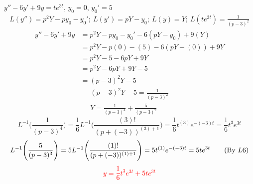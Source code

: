 \item [6.] $y''- 6y' + 9y= te^{3t}$, $y_0=0$, $y_0'=5$
\begin{gather*}
    L(y'')=p^2Y-py_0-y_0';\:
    L(y')=pY-y_0;\:
    L(y)=Y;\:
    L(te^{3t})=\frac{1}{(p-3)^2}
\end{gather*}
\begin{align*}
    y''- 6y' + 9y
    &=p^2Y-py_0-y_0'-6(pY-y_0)+9(Y)\\
    &=p^2Y-p(0)-(5)-6(pY-(0))+9Y\\
    &=p^2Y-5-6pY+9Y\\
    &=p^2Y-6pY+9Y-5\\
    &=(p-3)^2Y-5
\end{align*}
\begin{gather*}
    (p-3)^2Y-5=\frac{1}{(p-3)^2}\\
    Y=\frac{1}{(p-3)^4}+\frac{5}{(p-3)^2}
\end{gather*}
\begin{equation*}
    L^{-1}\Bigg(\frac{1}{(p-3)^4}\Bigg) 
    = \frac{1}{6}L^{-1}\Bigg(\frac{(3)!}{(p+(-3))^{(3)+1}}\Bigg) 
    =\frac{1}{6}t^{(3)}e^{-(-3)t}
    =\frac{1}{6}t^3e^{3t}
    \tag{By \( L6 \)}
\end{equation*}
\begin{equation*}
    L^{-1}\Bigg(\frac{5}{(p-3)^3}\Bigg) 
    = 5L^{-1}\Bigg(\frac{(1)!}{(p+(-3))^{(1)+1}}\Bigg) 
    =5t^{(1)}e^{-(-3)t}
    =5te^{3t}
    \tag{By \( L6 \)}\\
\end{equation*}
\textcolor{red}{\[
   y= \frac{1}{6}t^3e^{3t}+5te^{3t}
\]}